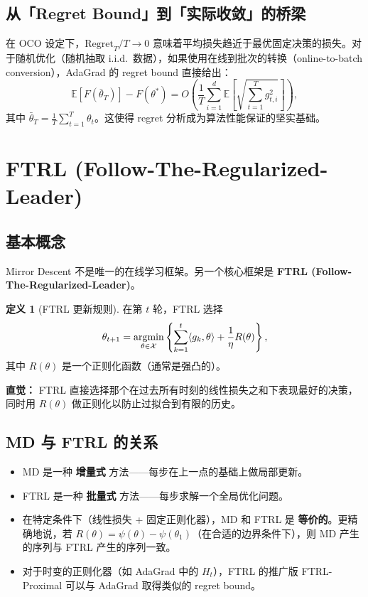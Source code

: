 \documentclass[12pt,a4paper]{ctexart}
\theoremstyle{definition}
\newtheorem{definition}{定义}[section]
\theoremstyle{plain}
\theoremstyle{remark}
\newcommand{\E}{\mathbb{E}}
\newcommand{\cX}{\mathcal{X}}
\newcommand{\argmin}{\operatornamewithlimits{argmin}}
\newcommand{\Regret}{\mathrm{Regret}}
\begin{document}
\subsection{从「Regret Bound」到「实际收敛」的桥梁}
在 OCO 设定下，$\Regret_T/T \to 0$ 意味着平均损失趋近于最优固定决策的损失。对于随机优化（随机抽取 i.i.d.\ 数据），如果使用在线到批次的转换（online-to-batch conversion），AdaGrad 的 regret bound 直接给出：
\[
  \E[F(\bar{\theta}_T)] - F(\theta^*) = O\!\left(\frac{1}{T} \sum_{i=1}^{d} \E\!\left[\sqrt{\sum_{t=1}^{T}g_{t,i}^2}\right]\right),
\]
其中 $\bar{\theta}_T = \frac{1}{T}\sum_{t=1}^T \theta_t$。这使得 regret 分析成为算法性能保证的坚实基础。

\section{FTRL (Follow-The-Regularized-Leader)}

\subsection{基本概念}

Mirror Descent 不是唯一的在线学习框架。另一个核心框架是 \textbf{FTRL (Follow-The-Regularized-Leader)}。

\begin{definition}[FTRL 更新规则]
在第 $t$ 轮，FTRL 选择
\begin{equation}\label{eq:ftrl}
  \theta_{t+1}
  = \argmin_{\theta \in \cX}
    \left\{
      \sum_{k=1}^{t} \langle g_k, \theta \rangle + \frac{1}{\eta} R(\theta)
    \right\},
\end{equation}
其中 $R(\theta)$ 是一个正则化函数（通常是强凸的）。
\end{definition}

\textbf{直觉：} FTRL 直接选择那个在过去所有时刻的线性损失之和下表现最好的决策，同时用 $R(\theta)$ 做正则化以防止过拟合到有限的历史。

\subsection{MD 与 FTRL 的关系}

\begin{itemize}
  \item MD 是一种 \textbf{增量式} 方法——每步在上一点的基础上做局部更新。
  \item FTRL 是一种 \textbf{批量式} 方法——每步求解一个全局优化问题。
  \item 在特定条件下（线性损失 + 固定正则化器），MD 和 FTRL 是 \textbf{等价的}。更精确地说，若 $R(\theta) = \psi(\theta) - \psi(\theta_1)$（在合适的边界条件下），则 MD 产生的序列与 FTRL 产生的序列一致。
  \item 对于时变的正则化器（如 AdaGrad 中的 $H_t$），FTRL 的推广版 FTRL-Proximal 可以与 AdaGrad 取得类似的 regret bound。
\end{itemize}
\end{document}
